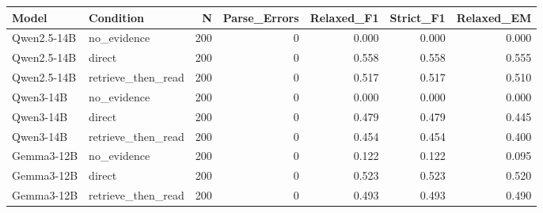 \begin{tabular}{llrrrrr}
\toprule
Model & Condition & N & Parse_Errors & Relaxed_F1 & Strict_F1 & Relaxed_EM \\
\midrule
Qwen2.5-14B & no_evidence & 200 & 0 & 0.000 & 0.000 & 0.000 \\
Qwen2.5-14B & direct & 200 & 0 & 0.558 & 0.558 & 0.555 \\
Qwen2.5-14B & retrieve_then_read & 200 & 0 & 0.517 & 0.517 & 0.510 \\
Qwen3-14B & no_evidence & 200 & 0 & 0.000 & 0.000 & 0.000 \\
Qwen3-14B & direct & 200 & 0 & 0.479 & 0.479 & 0.445 \\
Qwen3-14B & retrieve_then_read & 200 & 0 & 0.454 & 0.454 & 0.400 \\
Gemma3-12B & no_evidence & 200 & 0 & 0.122 & 0.122 & 0.095 \\
Gemma3-12B & direct & 200 & 0 & 0.523 & 0.523 & 0.520 \\
Gemma3-12B & retrieve_then_read & 200 & 0 & 0.493 & 0.493 & 0.490 \\
\bottomrule
\end{tabular}
